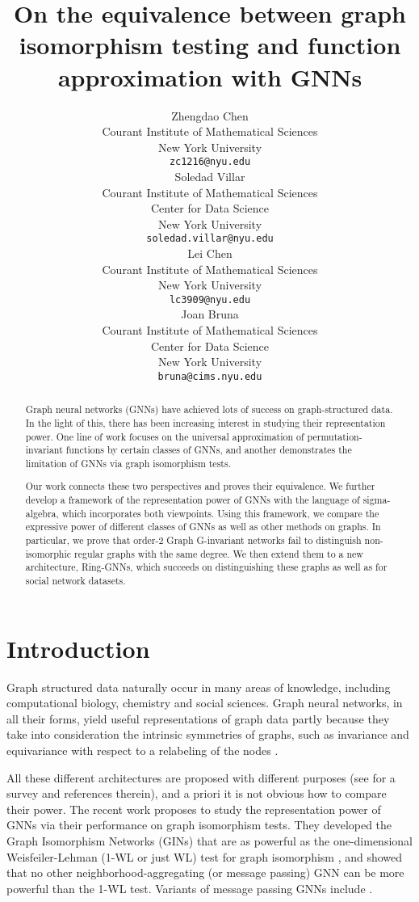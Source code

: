 \documentclass{article}
\title{On the equivalence between graph isomorphism testing and function approximation with GNNs}
\author{Zhengdao Chen \\
  Courant Institute of Mathematical Sciences\\
  New York University\\
  \texttt{zc1216@nyu.edu} \\
\And
     Soledad Villar \\
  Courant Institute of Mathematical Sciences\\
  Center for Data Science \\
  New York University\\
  \texttt{soledad.villar@nyu.edu} \\ 
\AND
     Lei Chen \\
  Courant Institute of Mathematical Sciences\\
  New York University\\
  \texttt{lc3909@nyu.edu} \\
\And
    Joan Bruna \\
  Courant Institute of Mathematical Sciences\\
  Center for Data Science \\
  New York University\\
  \texttt{bruna@cims.nyu.edu} \\ 
}
\begin{document}
\maketitle


\begin{abstract}
Graph neural networks (GNNs) have achieved lots of success on graph-structured data. In the light of this, there has been increasing interest in studying their representation power. One line of work focuses on the universal approximation of permutation-invariant functions by certain classes of GNNs, and another demonstrates the limitation of GNNs via graph isomorphism tests.
           
Our work connects these two perspectives and proves their equivalence. We further develop a framework of the representation power of GNNs with the language of sigma-algebra, which incorporates both viewpoints. Using this framework, we compare the expressive power of different classes of GNNs as well as other methods on graphs. In particular, we prove that order-2 Graph G-invariant networks fail to distinguish non-isomorphic regular graphs with the same degree. We then extend them to a new architecture, Ring-GNNs, which succeeds on distinguishing these graphs as well as for social network datasets.





    
    
\end{abstract}




\section{Introduction}
Graph structured data naturally occur in many areas of knowledge, including computational biology, chemistry and social sciences. Graph neural networks, in all their forms, yield useful representations of graph data partly because they take into consideration the intrinsic symmetries of graphs, such as invariance and equivariance with respect to a relabeling of the nodes \cite{scarselli2008graph, duvenaud2015convolutional, kipf2016semi, gilmer2017neural, hamilton2017representation, velivckovic2017graph, bronstein2017geometric}.

All these different architectures are proposed with different purposes (see \cite{wu2019comprehensive} for a survey and references therein), and a priori it is not obvious how to compare their power. The recent work \cite{xu2018powerful} proposes to study the representation power of GNNs via their performance on graph isomorphism tests. They developed the Graph Isomorphism Networks (GINs) that are as powerful as the one-dimensional Weisfeiler-Lehman (1-WL or just WL) test for graph isomorphism \cite{weisfeiler1968reduction}, and showed that no other neighborhood-aggregating (or message passing) GNN can be more powerful than the 1-WL test. Variants of message passing GNNs include \cite{scarselli2008graph, hamilton2017inductive}. 
\end{document}
